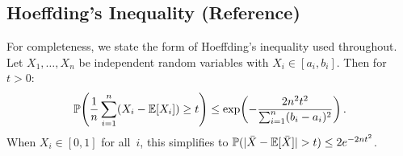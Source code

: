 \subsection{Hoeffding's Inequality (Reference)}

For completeness, we state the form of Hoeffding's inequality used throughout.
Let $X_1, \ldots, X_n$ be independent random variables with $X_i \in [a_i, b_i]$.
Then for $t > 0$:
\begin{equation}
\mathbb{P}\!\left(\frac{1}{n}\sum_{i=1}^n (X_i - \mathbb{E}[X_i]) \ge t\right)
\le \exp\!\left(-\frac{2n^2 t^2}{\sum_{i=1}^n (b_i - a_i)^2}\right).
\end{equation}
When $X_i \in [0,1]$ for all~$i$, this simplifies to
$\mathbb{P}(|\bar{X} - \mathbb{E}[\bar{X}]| > t) \le 2e^{-2nt^2}$.

